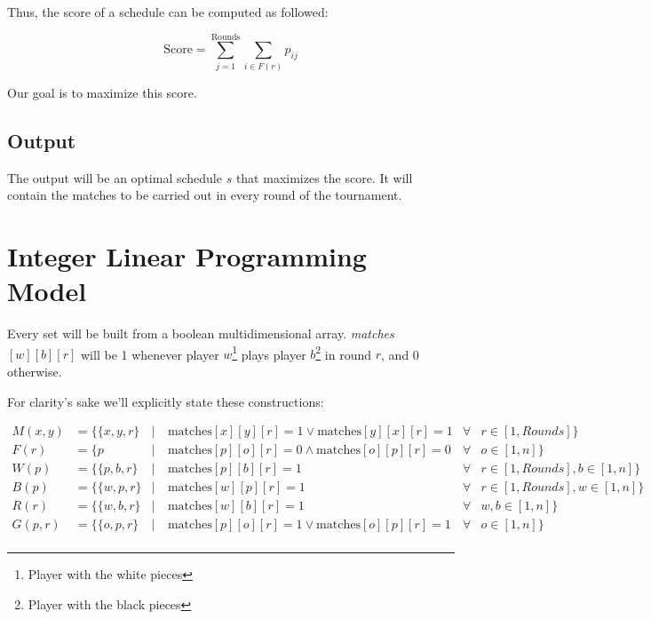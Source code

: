 \documentclass[a4paper, 10pt]{article}
\begin{document}
Thus, the score of a schedule can be computed as followed:

\begin{equation}
    \text{Score} = \sum_{j = 1}^{\text{Rounds}} \sum_{i \in F(r)}  p_{ij}
    \label{objfunc}
\end{equation}


Our goal is to maximize this score.






\subsection{Output}
The output will be an optimal schedule $s$ that maximizes the score. It will contain the matches to be carried out in every round of the tournament.

\clearpage

\section{Integer Linear Programming Model}
Every set will be built from a boolean multidimensional array. \textit{matches}$[w][b][r]$ will be 1 whenever player $w$\footnote{Player with the white pieces} plays player $b$\footnote{Player with the black pieces} in round $r$, and 0 otherwise.


For clarity's sake we'll explicitly state these constructions:

\begin{align*}
    M(x, y)   &= \{ \{x, y, r\} &|& \ \text{matches}[x][y][r] = 1 \lor \text{matches}[y][x][r] = 1   &\forall &r \in [1, Rounds]\}\\
    F(r)      &= \{ p           &|& \ \text{matches}[p][o][r] = 0 \land \text{matches}[o][p][r] = 0  &\forall &o \in [1, n]\}\\
    W(p)      &= \{ \{p, b, r\} &|& \ \text{matches}[p][b][r] = 1                                    &\forall &r \in [1, Rounds], b \in [1, n]\}\\
    B(p)      &= \{ \{w, p, r\} &|& \ \text{matches}[w][p][r] = 1                                    &\forall &r \in [1, Rounds], w \in [1, n]\}\\
    R(r)      &= \{ \{w, b, r\} &|& \ \text{matches}[w][b][r] = 1                                    &\forall &w, b \in [1, n]\}\\
    G(p, r)   &= \{ \{o, p, r\} &|& \ \text{matches}[p][o][r] = 1  \lor \text{matches}[o][p][r] = 1  &\forall &o \in [1, n]\}\\
\end{align*}
\end{document}
